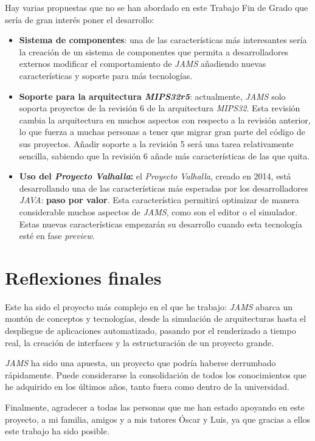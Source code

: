 Hay varias propuestas que no se han abordado en este Trabajo
Fin de Grado que sería de gran interés poner el desarrollo:
\begin{itemize}
    \item \textbf{Sistema de componentes}: una de las características
    más interesantes sería la creación de un sistema de componentes
    que permita a desarrolladores externos modificar el comportamiento
    de \textit{JAMS} añadiendo nuevas características y soporte para
    más tecnologías.
    \item \textbf{Soporte para la arquitectura \textit{MIPS32r5}}:
    actualmente, \textit{JAMS} solo soporta proyectos de la revisión 6
    de la arquitectura \textit{MIPS32}.
    Esta revisión cambia la arquitectura en muchos aspectos con respecto
    a la revisión anterior, lo que fuerza a muchas personas a tener
    que migrar gran parte del código de sus proyectos.
    Añadir soporte a la revisión 5 será una tarea relativamente sencilla,
    sabiendo que la revisión 6 añade más características de las que quita.
    \item \textbf{Uso del \textit{Proyecto Valhalla}:} el
    \textit{Proyecto Valhalla}\cite{PROJECT_VALHALLA}, creado en 2014,
    está desarrollando una de las características más esperadas
    por los desarrolladores \textit{JAVA}: \textbf{paso por valor}.
    Esta característica permitirá optimizar de manera considerable
    muchos aspectos de \textit{JAMS}, como son el editor o el simulador.
    Estas nuevas características empezarán su desarrollo cuando esta
    tecnología esté en fase \textit{preview}.
\end{itemize}


\section{Reflexiones finales}\label{sec:reflexiones-finales}

Este ha sido el proyecto más complejo en el que he trabajo:
\textit{JAMS} abarca un montón de conceptos y tecnologías,
desde la simulación de arquitecturas hasta el despliegue de
aplicaciones automatizado, pasando por el renderizado a tiempo
real, la creación de interfaces y la estructuración de un
proyecto grande.

\textit{JAMS} ha sido una apuesta, un proyecto
que podría haberse derrumbado rápidamente.
Puede considerarse la consolidación de todos los conocimientos
que he adquirido en los últimos años, tanto fuera como dentro
de la universidad.

Finalmente, agradecer a todas las personas que me han
estado apoyando en este proyecto, a mi familia, amigos y a mis
tutores Óscar y Luis, ya que gracias a ellos este trabajo
ha sido posible.
